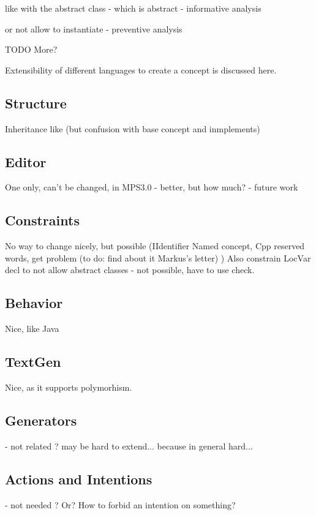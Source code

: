 like with the abstract class - which is abstract - informative analysis


or not allow to instantiate - preventive analysis

TODO More?




Extensibility of different languages to create a concept is discussed here.


\subsection{Structure}
Inheritance like (but confusion with base concept and inmplements)

\subsection{Editor} 
One only, can't be changed, in MPS3.0 - better, but how much? - future work

\subsection{Constraints}

No way to change nicely, but possible (IIdentifier Named concept, Cpp reserved words, get problem (to do: find about it Markus's letter) )
Also constrain LocVar decl to not allow abstract classes - not possible, have to use check.

\subsection{Behavior}

Nice, like Java

\subsection{TextGen}

Nice, as it supports polymorhism.

\subsection{Generators}
- not related ?
may be hard to extend... because in general hard...

\subsection{Actions and Intentions}
- not needed ? Or? How to forbid an intention on something?


